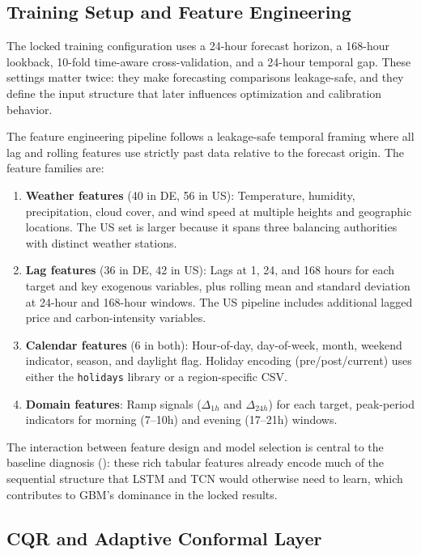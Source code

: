 \documentclass[11pt,a4paper]{article}
\begin{document}
\subsection{Training Setup and Feature Engineering}

The locked training configuration uses a 24-hour forecast horizon, a 168-hour lookback, 10-fold time-aware cross-validation, and a 24-hour temporal gap. These settings matter twice: they make forecasting comparisons leakage-safe, and they define the input structure that later influences optimization and calibration behavior.

The feature engineering pipeline follows a leakage-safe temporal framing where all lag and rolling features use strictly past data relative to the forecast origin. The feature families are:

\begin{enumerate}[leftmargin=*,topsep=2pt,itemsep=1pt]
  \item \textbf{Weather features} (40 in DE, 56 in US): Temperature, humidity, precipitation, cloud cover, and wind speed at multiple heights and geographic locations. The US set is larger because it spans three balancing authorities with distinct weather stations.
  \item \textbf{Lag features} (36 in DE, 42 in US): Lags at 1, 24, and 168 hours for each target and key exogenous variables, plus rolling mean and standard deviation at 24-hour and 168-hour windows. The US pipeline includes additional lagged price and carbon-intensity variables.
  \item \textbf{Calendar features} (6 in both): Hour-of-day, day-of-week, month, weekend indicator, season, and daylight flag. Holiday encoding (pre/post/current) uses either the \texttt{holidays} library or a region-specific CSV.
  \item \textbf{Domain features}: Ramp signals ($\Delta_{1h}$ and $\Delta_{24h}$) for each target, peak-period indicators for morning (7--10h) and evening (17--21h) windows.
\end{enumerate}

The interaction between feature design and model selection is central to the baseline diagnosis (): these rich tabular features already encode much of the sequential structure that LSTM and TCN would otherwise need to learn, which contributes to GBM's dominance in the locked results.

\subsection{CQR and Adaptive Conformal Layer}
\end{document}
